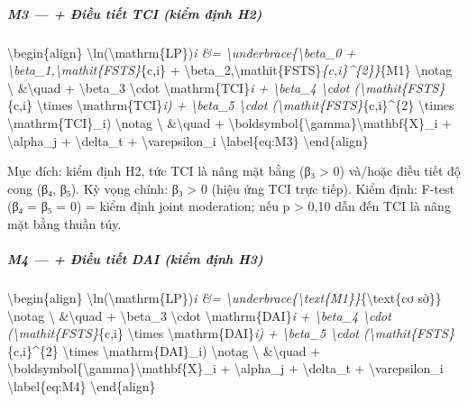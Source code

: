 \documentclass[12pt,a4paper]{article}
\begin{document}
\hypertarget{m3---ux111iux1ec1u-tiux1ebft-tci-kiux1ec3m-ux111ux1ecbnh-h2}{%
\subparagraph{M3 --- + Điều tiết TCI (kiểm định
H2)}\label{m3---ux111iux1ec1u-tiux1ebft-tci-kiux1ec3m-ux111ux1ecbnh-h2}}

\textbackslash begin\{align\}
\textbackslash ln(\textbackslash mathrm\{LP\})\emph{i \&=
\textbackslash underbrace\{\textbackslash beta\_0 +
\textbackslash beta\_1,\textbackslash mathit\{FSTS\}}\{c,i\} +
\textbackslash beta\_2,\textbackslash mathit\{FSTS\}\emph{\{c,i\}\^{}\{2\}\}}\{M1\}
\textbackslash notag \textbackslash{} \&\textbackslash quad +
\textbackslash beta\_3 \textbackslash cdot
\textbackslash mathrm\{TCI\}\emph{i + \textbackslash beta\_4
\textbackslash cdot (\textbackslash mathit\{FSTS\}}\{c,i\}
\textbackslash times \textbackslash mathrm\{TCI\}\emph{i) +
\textbackslash beta\_5 \textbackslash cdot
(\textbackslash mathit\{FSTS\}}\{c,i\}\^{}\{2\} \textbackslash times
\textbackslash mathrm\{TCI\}\_i) \textbackslash notag \textbackslash{}
\&\textbackslash quad +
\textbackslash boldsymbol\{\textbackslash gamma\}\textquotesingle\textbackslash mathbf\{X\}\_i
+ \textbackslash alpha\_j + \textbackslash delta\_t +
\textbackslash varepsilon\_i \textbackslash label\{eq:M3\}
\textbackslash end\{align\}

Mục đích: kiểm định H2, tức TCI là nâng mặt bằng (β₃ \textgreater{} 0)
và/hoặc điều tiết độ cong (β₄, β₅). Kỳ vọng chính: β₃ \textgreater{} 0
(hiệu ứng TCI trực tiếp). Kiểm định: F-test (β₄ = β₅ = 0) = kiểm định
joint moderation; nếu p \textgreater{} 0,10 dẫn đến TCI là nâng mặt bằng
thuần túy.

\hypertarget{m4---ux111iux1ec1u-tiux1ebft-dai-kiux1ec3m-ux111ux1ecbnh-h3}{%
\subparagraph{M4 --- + Điều tiết DAI (kiểm định
H3)}\label{m4---ux111iux1ec1u-tiux1ebft-dai-kiux1ec3m-ux111ux1ecbnh-h3}}

\textbackslash begin\{align\}
\textbackslash ln(\textbackslash mathrm\{LP\})\emph{i \&=
\textbackslash underbrace\{\textbackslash text\{M1\}\}}\{\textbackslash text\{cơ
sở\}\} \textbackslash notag \textbackslash{} \&\textbackslash quad +
\textbackslash beta\_3 \textbackslash cdot
\textbackslash mathrm\{DAI\}\emph{i + \textbackslash beta\_4
\textbackslash cdot (\textbackslash mathit\{FSTS\}}\{c,i\}
\textbackslash times \textbackslash mathrm\{DAI\}\emph{i) +
\textbackslash beta\_5 \textbackslash cdot
(\textbackslash mathit\{FSTS\}}\{c,i\}\^{}\{2\} \textbackslash times
\textbackslash mathrm\{DAI\}\_i) \textbackslash notag \textbackslash{}
\&\textbackslash quad +
\textbackslash boldsymbol\{\textbackslash gamma\}\textquotesingle\textbackslash mathbf\{X\}\_i
+ \textbackslash alpha\_j + \textbackslash delta\_t +
\textbackslash varepsilon\_i \textbackslash label\{eq:M4\}
\textbackslash end\{align\}
\end{document}
